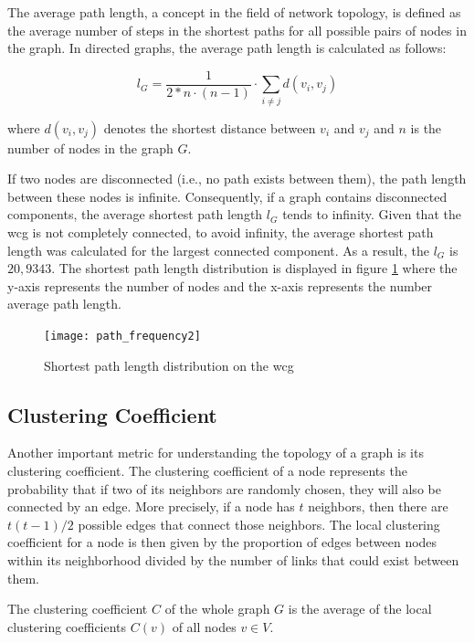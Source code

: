 The average path length, a concept in the field of network topology, is defined as the average number of steps in the shortest paths for all possible pairs of nodes in the graph. In directed graphs, the average path length is calculated as follows:

\begin{equation}
l_{G}={\frac  {1}{2 * n\cdot (n-1)}}\cdot \sum _{{i\neq j}}d(v_{i},v_{j})
\end{equation}

where $d(v_{i},v_{j})$ denotes the shortest distance between $v_i$ and $v_j$ and $n$ is the number of nodes in the graph $G$. 

If two nodes are disconnected (i.e., no path exists between them), the path length between these nodes is infinite. Consequently, if a graph contains disconnected components, the average shortest path length $l_G$ tends to infinity. 
Given that the \gls{wcg} is not completely connected, to avoid infinity, the average shortest path length was calculated for the largest connected component. As a result, the $l_G$ is $20,9343$. The shortest path length distribution is displayed in figure \ref{fig:path-distribution} where the y-axis represents the number of nodes and the x-axis represents the number average path length. 


\begin{figure}[H]
  \texttt{[image: path\_frequency2]}
  \caption{Shortest path length distribution on the \gls{wcg}}
  \label{fig:path-distribution}
\end{figure}


\subsection{\hspace*{3pt} Clustering Coefficient}


Another important metric for understanding the topology of a graph is its clustering coefficient. The clustering coefficient of a node represents the probability that if two of its neighbors are randomly chosen, they will also be connected by an edge. More precisely, if a node has $t$ neighbors, then there are $t(t-1)/2$ possible edges that connect those neighbors. 
The local clustering coefficient for a node is then given by the proportion of edges between nodes within its neighborhood divided by the number of links that could exist between them. 

The clustering coefficient $C$ of the whole graph $G$ is the average of the local clustering coefficients $C(v)$ of all nodes $v \in V$. 

